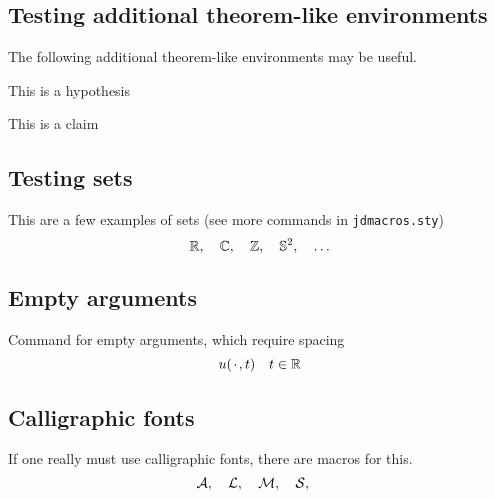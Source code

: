 \documentclass[a4paper]{siamart190516}
\begin{document}
\subsection{Testing additional theorem-like environments} The following additional
theorem-like environments may be useful.

\begin{hypothesis} \label{hyp:trivial}
  This is a hypothesis
\end{hypothesis}

\begin{claim} \label{clm:trivial}
  This is a claim
\end{claim}

\subsection{Testing sets}
This are a few examples of sets (see more commands in \texttt{jdmacros.sty})
\[
  \mathbb{R}, \quad
  \mathbb{C}, \quad
  \mathbb{Z}, \quad
  \mathbb{S}^2, \quad
  \ldots
\]

\subsection{Empty arguments}
Command for empty arguments, which require spacing
\[
  u({\mkern 2mu\cdot\mkern 2mu},t) \quad t \in \mathbb{R}
\]

\subsection{Calligraphic fonts}
If one really must use calligraphic fonts, there are macros for this.
\[
  \mathcal{A}, \quad
  \mathcal{L}, \quad
  \mathcal{M}, \quad
  \mathcal{S}, \quad
\]




\end{document}
